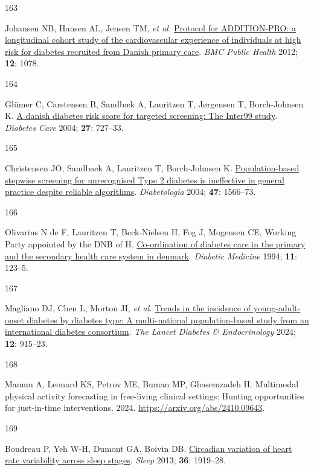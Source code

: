 \documentclass[
  a4paper,
  headsepline=true,
  open=left]{scrbook}
\newlength{\cslhangindent}
\newlength{\csllabelwidth}
\newlength{\cslentryspacingunit} %
\newenvironment{CSLReferences}[2] %
 {%
  \setlength{\parindent}{0pt}
  \ifodd #1
  \let\oldpar\par
  \def\par{\hangindent=\cslhangindent\oldpar}
  \fi
  \setlength{\parskip}{#2\cslentryspacingunit}
 }%
 {}
\newcommand{\CSLLeftMargin}[1]{\parbox[t]{\csllabelwidth}{#1}}
\newcommand{\CSLRightInline}[1]{\parbox[t]{\linewidth - \csllabelwidth}{#1}\break}
\begin{document}
\begin{CSLReferences}{0}{0}
\leavevmode{}%
\CSLLeftMargin{163 }%
\CSLRightInline{Johansen NB, Hansen AL, Jensen TM, \emph{et al.}
\href{https://doi.org/10.1186/1471-2458-12-1078}{Protocol for
ADDITION-PRO: a longitudinal cohort study of the cardiovascular
experience of individuals at high risk for diabetes recruited from
Danish primary care}. \emph{BMC Public Health} 2012; \textbf{12}: 1078.}

\leavevmode{}%
\CSLLeftMargin{164 }%
\CSLRightInline{Glümer C, Carstensen B, Sandbæk A, Lauritzen T,
Jørgensen T, Borch-Johnsen K.
\href{https://doi.org/10.2337/diacare.27.3.727}{A danish diabetes risk
score for targeted screening: The Inter99 study}. \emph{Diabetes Care}
2004; \textbf{27}: 727--33.}

\leavevmode{}%
\CSLLeftMargin{165 }%
\CSLRightInline{Christensen JO, Sandbaek A, Lauritzen T, Borch-Johnsen
K. \href{https://doi.org/10.1007/s00125-004-1496-2}{Population-based
stepwise screening for unrecognised Type 2 diabetes is ineffective in
general practice despite reliable algorithms}. \emph{Diabetologia} 2004;
\textbf{47}: 1566--73.}

\leavevmode{}%
\CSLLeftMargin{166 }%
\CSLRightInline{Olivarius N de F, Lauritzen T, Beck-Nielsen H, Fog J,
Mogensen CE, Working Party appointed by the DNB of H.
\href{https://doi.org/10.1111/j.1464-5491.1994.tb00243.x}{Co-ordination
of diabetes care in the primary and the secondary health care system in
denmark}. \emph{Diabetic Medicine} 1994; \textbf{11}: 123--5.}

\leavevmode{}%
\CSLLeftMargin{167 }%
\CSLRightInline{Magliano DJ, Chen L, Morton JI, \emph{et al.}
\href{https://doi.org/10.1016/S2213-8587(24)00243-2}{Trends in the
incidence of young-adult-onset diabetes by diabetes type: A
multi-national population-based study from an international diabetes
consortium}. \emph{The Lancet Diabetes \& Endocrinology} 2024;
\textbf{12}: 915--23.}

\leavevmode{}%
\CSLLeftMargin{168 }%
\CSLRightInline{Mamun A, Leonard KS, Petrov ME, Buman MP, Ghasemzadeh H.
Multimodal physical activity forecasting in free-living clinical
settings: Hunting opportunities for just-in-time interventions. 2024.
\url{https://arxiv.org/abs/2410.09643}.}

\leavevmode{}%
\CSLLeftMargin{169 }%
\CSLRightInline{Boudreau P, Yeh W-H, Dumont GA, Boivin DB.
\href{https://doi.org/10.5665/sleep.3230}{Circadian variation of heart
rate variability across sleep stages}. \emph{Sleep} 2013; \textbf{36}:
1919--28.}


\end{CSLReferences}
\end{document}
